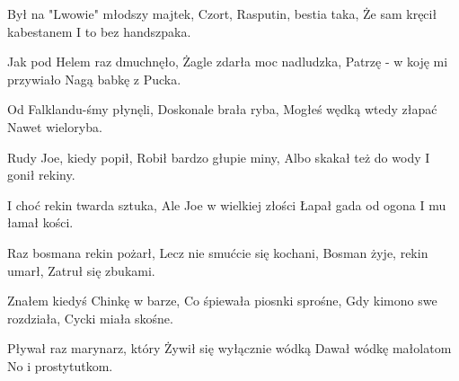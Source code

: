 \documentclass[../../../songbook.tex]{subfiles}
\begin{document}
\begin{multicols}{3}
{Był na "Lwowie" młodszy majtek, \newline
Czort, Rasputin, bestia taka, \newline
Że sam kręcił kabestanem \newline
I to bez handszpaka. \newline

Jak pod Helem raz dmuchnęło, \newline
Żagle zdarła moc nadludzka, \newline
Patrzę - w koję mi przywiało \newline
Nagą babkę z Pucka. \newline

Od Falklandu-śmy płynęli, \newline
Doskonale brała ryba, \newline
Mogłeś wędką wtedy złapać \newline
Nawet wieloryba. \newline

Rudy Joe, kiedy popił, \newline
Robił bardzo głupie miny, \newline
Albo skakał też do wody \newline
I gonił rekiny.

I choć rekin twarda sztuka, \newline
Ale Joe w wielkiej złości \newline
Łapał gada od ogona \newline
I mu łamał kości. \newline

Raz bosmana rekin pożarł, \newline
Lecz nie smućcie się kochani, \newline
Bosman żyje, rekin umarł, \newline
Zatruł się zbukami. \newline

Znałem kiedyś Chinkę w barze, \newline
Co śpiewała piosnki sprośne, \newline
Gdy kimono swe rozdziała, \newline
Cycki miała skośne. \newline

Pływał raz marynarz, który \newline
Żywił się wyłącznie wódką \newline
Dawał wódkę małolatom \newline
No i prostytutkom. \newline

}
\end{multicols}
\end{document}
